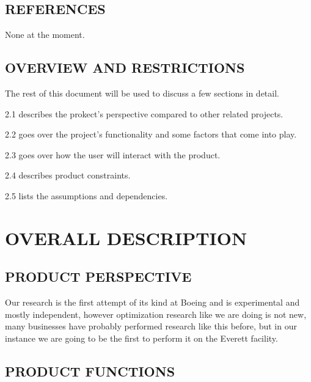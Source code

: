 \documentclass[twoside,letterpaper]{article}
\begin{document}
\subsection[REFERENCES]{\rmfamily\bfseries\color{black}
REFERENCES}
{\itshape\color{black}

{\color{black}
None at the moment.}


\subsection[OVERVIEW]{\rmfamily\bfseries\color{black}
OVERVIEW AND RESTRICTIONS}
{\color{black}
The rest of this document will be used to discuss a few sections in detail. }


2.1 describes the prokect's perspective compared to other related projects.

2.2 goes over the project's functionality and some factors that come into play.

2.3 goes over how the user will interact with the product.

2.4 describes product constraints.

2.5 lists the assumptions and dependencies.



\clearpage\section[OVERALL
DESCRIPTION]{\rmfamily\bfseries\color{black}
OVERALL DESCRIPTION}
{\color{black}


\subsection[PRODUCT
PERSPECTIVE]{\rmfamily\bfseries\color{black}
PRODUCT PERSPECTIVE}


{\color{black}
Our research is the first attempt of its kind at Boeing and is experimental and mostly independent, however optimization research like we are doing is not new, many businesses have probably performed research like this before, but in our instance we are going to be the first to perform it on the Everett facility.


\subsection[PRODUCT
FUNCTIONS]{\rmfamily\bfseries\color{black}
PRODUCT FUNCTIONS}


}}}
\end{document}
